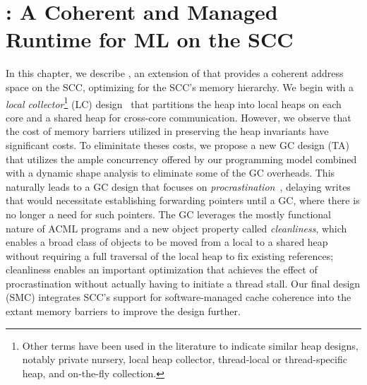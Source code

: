 \newcommand{\lc}{LC}
\newcommand{\ta}{TA}
\newcommand{\smc}{SMC}
\newcommand{\kcore}{k_{core}}
\newcommand{\kmesh}{k_{mesh}}
\newcommand{\kram}{k_{ram}}

\lstset{
language=C,
numbers=left,
numberstyle=\footnotesize,
frame=single}




\chapter{\MMSCC: A Coherent and Managed Runtime for ML on the SCC}
\label{chap:aneris}

In this chapter, we describe \MMSCC, an extension of \MM that provides a
coherent address space on the SCC, optimizing for the SCC's memory hierarchy.
We begin with a \emph{local collector}\footnote{Other terms have been used in
the literature to indicate similar heap designs, notably private nursery, local
heap collector, thread-local or thread-specific heap, and on-the-fly
collection.} (\lc) design~\cite{} that partitions the heap into local heaps on
each core and a shared heap for cross-core communication. However, we observe
that the cost of memory barriers utilized in preserving the heap invariants
have significant costs. To eliminitate theses costs, we propose a new GC design
(\ta) that utilizes the ample concurrency offered by our programming model
combined with a dynamic shape analysis to eliminate some of the GC overheads.
This naturally leads to a GC design that focuses on
\emph{procrastination}~\cite{mmgc}, delaying writes that would necessitate
establishing forwarding pointers until a GC, where there is no longer a need
for such pointers. The GC leverages the mostly functional nature of ACML
programs and a new object property called \emph{cleanliness}, which enables a
broad class of objects to be moved from a local to a shared heap without
requiring a full traversal of the local heap to fix existing references;
cleanliness enables an important optimization that achieves the effect of
procrastination without actually having to initiate a thread stall. Our final
design (\smc) integrates SCC's support for software-managed cache coherence
into the extant memory barriers to improve the design further.

